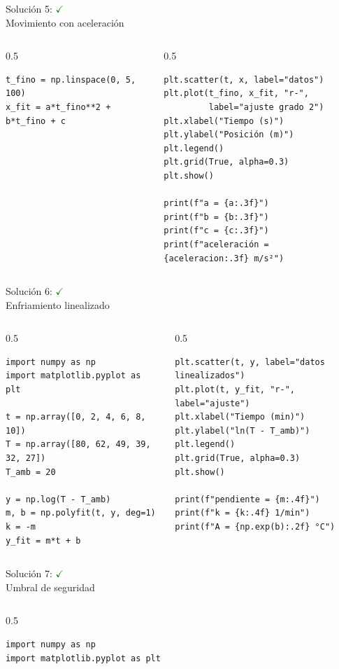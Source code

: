 \documentclass[10pt]{beamer}
\begin{document}
\begin{solutionblock}
\begin{frame}[fragile]{Solución 5: \hfill \textcolor{green}{$\checkmark$} \\ Movimiento con aceleración}
\begin{columns}
\begin{column}{0.5\textwidth}
\begin{verbatim}
t_fino = np.linspace(0, 5, 100)
x_fit = a*t_fino**2 + b*t_fino + c
\end{verbatim}
\end{column}
\begin{column}{0.5\textwidth}
\begin{verbatim}
plt.scatter(t, x, label="datos")
plt.plot(t_fino, x_fit, "r-",
         label="ajuste grado 2")
plt.xlabel("Tiempo (s)")
plt.ylabel("Posición (m)")
plt.legend()
plt.grid(True, alpha=0.3)
plt.show()

print(f"a = {a:.3f}")
print(f"b = {b:.3f}")
print(f"c = {c:.3f}")
print(f"aceleración = {aceleracion:.3f} m/s²")
\end{verbatim}
\end{column}
\end{columns}
\end{frame}

\begin{frame}[fragile]{Solución 6: \hfill \textcolor{green}{$\checkmark$} \\ Enfriamiento linealizado}
\begin{columns}
\begin{column}{0.5\textwidth}
\begin{verbatim}
import numpy as np
import matplotlib.pyplot as plt

t = np.array([0, 2, 4, 6, 8, 10])
T = np.array([80, 62, 49, 39, 32, 27])
T_amb = 20

y = np.log(T - T_amb)
m, b = np.polyfit(t, y, deg=1)
k = -m
y_fit = m*t + b
\end{verbatim}
\end{column}
\begin{column}{0.5\textwidth}
\begin{verbatim}
plt.scatter(t, y, label="datos linealizados")
plt.plot(t, y_fit, "r-", label="ajuste")
plt.xlabel("Tiempo (min)")
plt.ylabel("ln(T - T_amb)")
plt.legend()
plt.grid(True, alpha=0.3)
plt.show()

print(f"pendiente = {m:.4f}")
print(f"k = {k:.4f} 1/min")
print(f"A = {np.exp(b):.2f} °C")
\end{verbatim}
\end{column}
\end{columns}
\end{frame}

\begin{frame}[fragile]{Solución 7: \hfill \textcolor{green}{$\checkmark$} \\ Umbral de seguridad}
\begin{columns}
\begin{column}{0.5\textwidth}
\begin{verbatim}
import numpy as np
import matplotlib.pyplot as plt


\end{verbatim}
\end{column}
\end{columns}
\end{frame}
\end{solutionblock}
\end{document}
